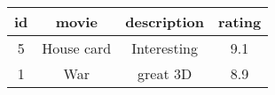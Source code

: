\begin{tabular}{|c|c|c|c|}
    \hline
        \textbf{id} & \textbf{movie} & \textbf{description} & \textbf{rating} \\ \hline
        5 & House card & Interesting & 9.1 \\ 
        1 & War & great 3D & 8.9 \\ \hline
\end{tabular}
